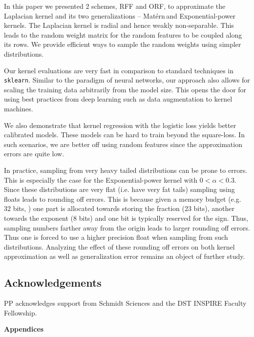 \documentclass{article}
\def\matern{Mat\'ern\,}
\def\cite{\citep}
\theoremstyle{plain}
\begin{document}
In this paper we presented 2 schemes, RFF and ORF, to approximate the Laplacian kernel and its two generalizations -- \matern and Exponential-power kernels. The Laplacian kernel is radial and hence weakly non-separable. This leads to the random weight matrix for the random features to be coupled along its rows. 
We provide efficient ways to sample the random weights using simpler distributions. 

Our kernel evaluations are very fast in comparison to standard techniques in \texttt{sklearn}. Similar to the paradigm of neural networks, our approach also allows for scaling the training data arbitrarily from the model size. This opens the door for using best practices from deep learning such as data augmentation to kernel machines. 

We also demonstrate that kernel regression with the logistic loss yields better calibrated models. These models can be hard to train beyond the square-loss. In such scenarios, we are better off using random features since the approximation errors are quite low.

In practice, sampling from very heavy tailed distributions can be prone to errors. This is especially the case for the Exponential-power kernel with $0<\alpha<0.3$. Since these distributions are very flat (i.e. have very fat tails) sampling using floats leads to rounding off errors. This is because given a memory budget (e.g. 32 bits, \cite[IEEE 754]{IEEE_754}) one part is allocated towards storing the fraction (23 bits), another towards the exponent (8 bits) and one bit is typically reserved for the sign. Thus, sampling numbers farther away from the origin leads to larger rounding off errors. Thus one is forced to use a higher precision float when sampling from such distributions. Analyzing the effect of these rounding off errors on both kernel approximation as well as generalization error remains an object of further study. 

\subsection*{Acknowledgements}
PP acknowledges support from Schmidt Sciences and the DST INSPIRE Faculty Fellowship.





\onecolumn
\appendix
{\center\bf\huge Appendices}
\end{document}
